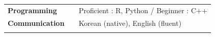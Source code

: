 \documentclass[a4paper, 12pt]{article}
\begin{document}
\begin{tabular}{p{11em} p{1em} p{43em}}
\vspace*{0.5pt}
\textbf{Programming} & &    
\vspace*{0.5pt} Proficient : R, Python \quad / \quad  Beginner : C++\\
\vspace*{0.5pt} 
\textbf{Communication} & &   
\vspace*{0.5pt} Korean (native), English (fluent)\\
\vspace*{0.5pt} 
\end{tabular}
\end{document}
